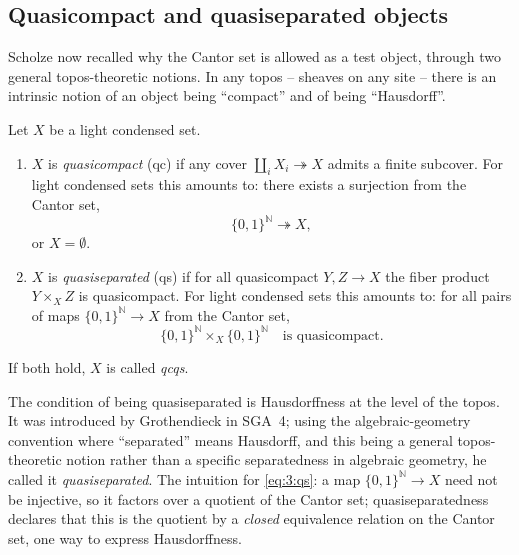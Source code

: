 \subsection{Quasicompact and quasiseparated objects}

Scholze now recalled why the Cantor set is allowed as a test object, through two
general topos-theoretic notions. In any topos -- sheaves on any site -- there
is an intrinsic notion of an object being ``compact'' and of being
``Hausdorff''.

\begin{definition}
\label{def:3:qc-qs}
Let $X$ be a light condensed set.
\begin{enumerate}
\item $X$ is \emph{quasicompact} (qc) if any cover
$\coprod_i X_i\twoheadrightarrow X$ admits a finite subcover. For light condensed
sets this amounts to: there exists a surjection from the Cantor set,
\begin{equation*}
\{0,1\}^{\mathbb{N}}\twoheadrightarrow X,
\end{equation*}
or $X=\emptyset$.
\item $X$ is \emph{quasiseparated} (qs) if for all quasicompact $Y,Z\to X$ the
fiber product $Y\times_X Z$ is quasicompact. For light condensed sets this
amounts to: for all pairs of maps $\{0,1\}^{\mathbb{N}}\to X$ from the Cantor
set,
\begin{equation}
\label{eq:3:qs}
\{0,1\}^{\mathbb{N}}\times_X\{0,1\}^{\mathbb{N}}\quad\text{is quasicompact.}
\end{equation}
\end{enumerate}
If both hold, $X$ is called \emph{qcqs}.
\end{definition}

\begin{remark}
\label{rmk:3:grothendieck-qs}
The condition of being quasiseparated is Hausdorffness at the level of the
topos. It was introduced by Grothendieck in SGA~4; using the algebraic-geometry
convention where ``separated'' means Hausdorff, and this being a general
topos-theoretic notion rather than a specific separatedness in algebraic
geometry, he called it \emph{quasiseparated}. The intuition for
\eqref{eq:3:qs}: a map $\{0,1\}^{\mathbb{N}}\to X$ need not be injective, so it
factors over a quotient of the Cantor set; quasiseparatedness declares that this
is the quotient by a \emph{closed} equivalence relation on the Cantor set, one
way to express Hausdorffness.
\end{remark}

